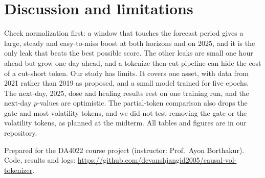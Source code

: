 \documentclass{article}
\begin{document}
\section{Discussion and limitations}

Check normalization first: a window that touches the forecast period gives a large, steady and
easy-to-miss boost at both horizons and on 2025, and it is the only leak that beats the best possible
score. The other leaks are small one hour ahead but grow one day ahead, and a tokenize-then-cut
pipeline can hide the cost of a cut-short token. Our study has limits. It covers one asset, with
data from 2021 rather than 2019 as proposed, and a small model trained for five epochs. The next-day,
2025, dose and healing results rest on one training run, and the next-day $p$-values are optimistic.
The partial-token comparison also drops the gate and most volatility tokens, and we did not test
removing the gate or the volatility tokens, as planned at the midterm. All tables and figures are in
our repository.

\begin{ack}
Prepared for the DA4022 course project (instructor: Prof.\ Ayon Borthakur). Code, results and logs:
\url{https://github.com/devanshjangid2005/causal-vol-tokenizer}.
\end{ack}

{\small


}
\end{document}
